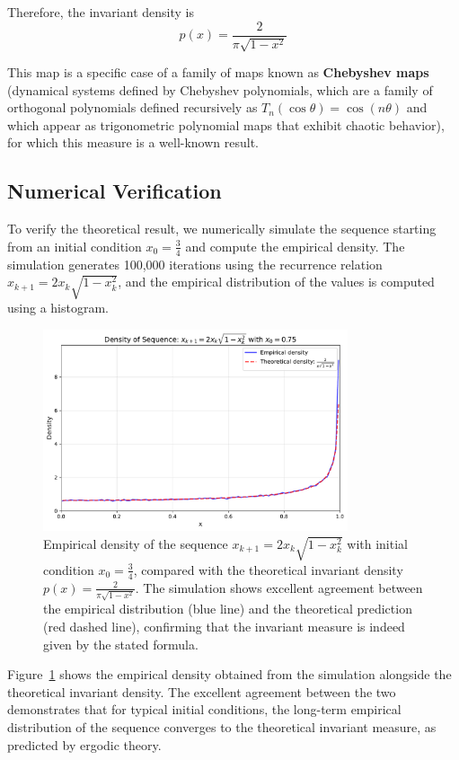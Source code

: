 \documentclass[12pt,a4paper]{article}
\begin{document}
Therefore, the invariant density is 
\[
p(x) = \frac{2}{\pi\sqrt{1-x^2}}
\]

This map is a specific case of a family of maps known as \textbf{Chebyshev maps} (dynamical systems defined by Chebyshev polynomials, which are a family of orthogonal polynomials defined recursively as $T_n(\cos\theta) = \cos(n\theta)$ and which appear as trigonometric polynomial maps that exhibit chaotic behavior), for which this measure is a well-known result.

\subsection{Numerical Verification}

To verify the theoretical result, we numerically simulate the sequence starting from an initial condition $x_0 = \frac{3}{4}$ and compute the empirical density. The simulation generates 100,000 iterations using the recurrence relation $x_{k+1} = 2x_k\sqrt{1-x_k^2}$, and the empirical distribution of the values is computed using a histogram.

\begin{figure}[htbp]
\centering
\includegraphics[width=0.8\textwidth]{data/density_0.75.pdf}
\caption{Empirical density of the sequence $x_{k+1} = 2x_k\sqrt{1-x_k^2}$ with initial condition $x_0 = \frac{3}{4}$, compared with the theoretical invariant density $p(x) = \frac{2}{\pi\sqrt{1-x^2}}$. The simulation shows excellent agreement between the empirical distribution (blue line) and the theoretical prediction (red dashed line), confirming that the invariant measure is indeed given by the stated formula.}
\label{fig:density}
\end{figure}

Figure~\ref{fig:density} shows the empirical density obtained from the simulation alongside the theoretical invariant density. The excellent agreement between the two demonstrates that for typical initial conditions, the long-term empirical distribution of the sequence converges to the theoretical invariant measure, as predicted by ergodic theory.
\end{document}
